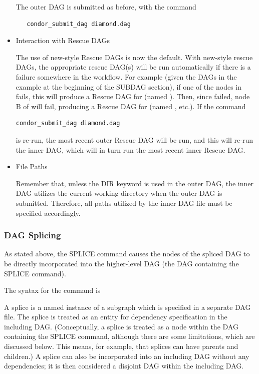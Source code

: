 \begin{itemize}
The outer DAG is submitted as before, with the command
\begin{verbatim}
   condor_submit_dag diamond.dag
\end{verbatim}

\item{Interaction with Rescue DAGs}

The use of new-style Rescue DAGs is now the default.  
With new-style rescue DAGs, the appropriate rescue DAG(s) will be run
automatically if there is a failure somewhere in the workflow.
For example (given the DAGs in the example at the beginning of
the SUBDAG section), if one of the
nodes in  fails, this will produce a Rescue
DAG for  (named ).
Then,
since  failed, node B of  will fail,
producing a Rescue DAG for 
(named , etc.).  
If the command
\begin{verbatim}
condor_submit_dag diamond.dag
\end{verbatim}
is re-run, the most recent outer Rescue
DAG will be run, and this will re-run the inner DAG, which will
in turn run the most recent inner Rescue DAG.  

\item{File Paths}

Remember that, unless the DIR keyword is used in the outer DAG,
the inner DAG utilizes the current working directory when the outer DAG
is submitted.
Therefore, all paths utilized by the inner DAG file
must be specified accordingly.

\end{itemize}

\subsubsection{\label{sec:DAGSplicing}DAG Splicing}

As stated above, the SPLICE command causes the nodes of the
spliced DAG to be directly incorporated into the higher-level
DAG (the DAG containing the SPLICE command).

The syntax for the  command is

   

A splice is a named instance of a subgraph which is specified in a
separate DAG file.
The splice is treated as an  entity for dependency
specification in the including DAG.
(Conceptually, a splice is treated as a node within the DAG
containing the SPLICE command, although there are some limitations,
which are discussed below.  This means, for example, that splices can have
parents and children.)
A splice can also be incorporated into an including DAG without any
dependencies; it is then considered
a disjoint DAG within the including DAG.

